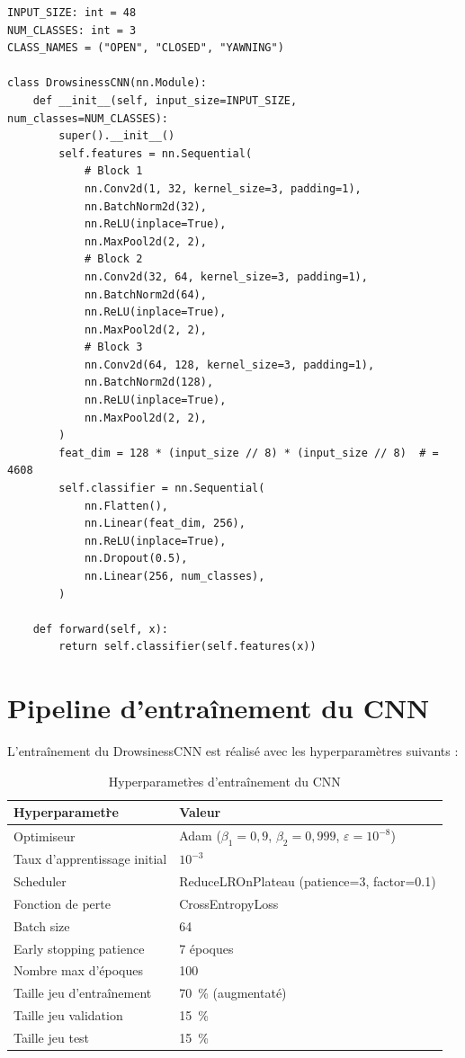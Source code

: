 \documentclass[12pt,a4paper]{report}
\begin{document}
\begin{lstlisting}[style=python, caption={Architecture DrowsinessCNN (models/cnn\_model.py)}, label=lst:cnn_model]
INPUT_SIZE: int = 48
NUM_CLASSES: int = 3
CLASS_NAMES = ("OPEN", "CLOSED", "YAWNING")

class DrowsinessCNN(nn.Module):
    def __init__(self, input_size=INPUT_SIZE, num_classes=NUM_CLASSES):
        super().__init__()
        self.features = nn.Sequential(
            # Block 1
            nn.Conv2d(1, 32, kernel_size=3, padding=1),
            nn.BatchNorm2d(32),
            nn.ReLU(inplace=True),
            nn.MaxPool2d(2, 2),
            # Block 2
            nn.Conv2d(32, 64, kernel_size=3, padding=1),
            nn.BatchNorm2d(64),
            nn.ReLU(inplace=True),
            nn.MaxPool2d(2, 2),
            # Block 3
            nn.Conv2d(64, 128, kernel_size=3, padding=1),
            nn.BatchNorm2d(128),
            nn.ReLU(inplace=True),
            nn.MaxPool2d(2, 2),
        )
        feat_dim = 128 * (input_size // 8) * (input_size // 8)  # = 4608
        self.classifier = nn.Sequential(
            nn.Flatten(),
            nn.Linear(feat_dim, 256),
            nn.ReLU(inplace=True),
            nn.Dropout(0.5),
            nn.Linear(256, num_classes),
        )

    def forward(self, x):
        return self.classifier(self.features(x))
\end{lstlisting}

\section{Pipeline d'entra\^inement du CNN}

L'entra\^inement du DrowsinessCNN est r\'ealis\'e avec les hyperp\-aram\`etres suivants :

\begin{table}[H]
\centering
\caption{Hyperparamet\`res d'entra\^inement du CNN}
\label{tab:cnn_training}
\begin{tabular}{L{5cm} L{7cm}}
\toprule
\textbf{Hyperparamet\`re} & \textbf{Valeur} \\
\midrule
Optimiseur & Adam ($\beta_1=0{,}9$, $\beta_2=0{,}999$, $\varepsilon=10^{-8}$) \\
Taux d'apprentissage initial & $10^{-3}$ \\
Scheduler & ReduceLROnPlateau (patience=3, factor=0.1) \\
Fonction de perte & CrossEntropyLoss \\
Batch size & 64 \\
Early stopping patience & 7 \'epoques \\
Nombre max d'\'epoques & 100 \\
Taille jeu d'entra\^inement & 70~\% (augmentat\'e) \\
Taille jeu validation & 15~\% \\
Taille jeu test & 15~\% \\
\bottomrule
\end{tabular}
\end{table}
\end{document}
